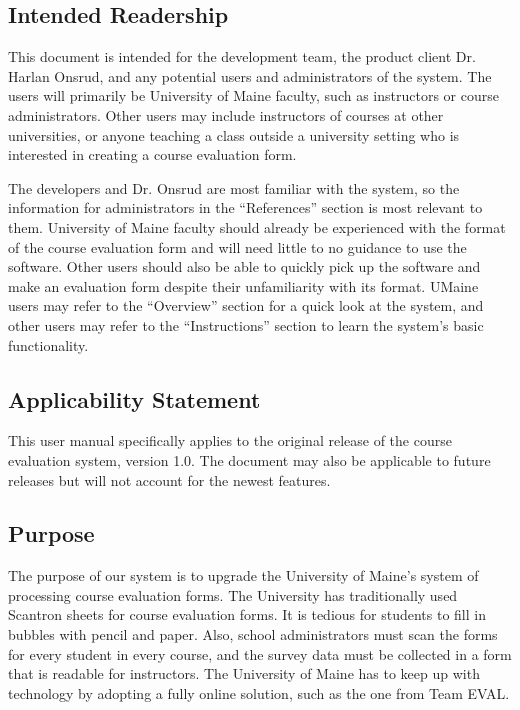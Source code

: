 \documentclass{article}
\begin{document}
\subsection{Intended Readership}

This document is intended for the development team, the product client Dr. Harlan Onsrud, and any potential users and administrators of the system. The users will primarily be University of Maine faculty, such as instructors or course administrators. Other users may include instructors of courses at other universities, or anyone teaching a class outside a university setting who is interested in creating a course evaluation form.

The developers and Dr. Onsrud are most familiar with the system, so the information for administrators in the ``References'' section is most relevant to them. University of Maine faculty should already be experienced with the format of the course evaluation form and will need little to no guidance to use the software. Other users should also be able to quickly pick up the software and make an evaluation form despite their unfamiliarity with its format. UMaine users may refer to the ``Overview'' section for a quick look at the system, and other users may refer to the ``Instructions'' section to learn the system's basic functionality.

\subsection{Applicability Statement}

This user manual specifically applies to the original release of the course evaluation system, version 1.0. The document may also be applicable to future releases but will not account for the newest features.

\subsection{Purpose}

The purpose of our system is to upgrade the University of Maine's system of processing course evaluation forms. The University has traditionally used Scantron sheets for course evaluation forms. It is tedious for students to fill in bubbles with pencil and paper. Also, school administrators must scan the forms for every student in every course, and the survey data must be collected in a form that is readable for instructors. The University of Maine has to keep up with technology by adopting a fully online solution, such as the one from Team EVAL.
\end{document}
